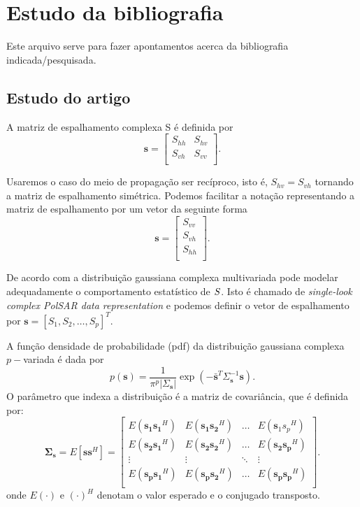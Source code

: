 \documentclass[12pt,a4paper]{article}
\begin{document}
\section{Estudo da bibliografia}

Este arquivo serve para fazer apontamentos acerca da bibliografia indicada/pesquisada.

\subsection{Estudo do artigo~\cite{lee94}}

A matriz de espalhamento complexa {\boldmath S} é definida por
$$
\mathbf{ s} = \left[
\begin{array}{cc}
	S_{hh}   & S_{hv}   \\
	S_{vh}   & S_{vv}   \\
\end{array}
\right].
$$

Usaremos o caso do meio de propagação ser recíproco, isto é, $S_{hv}=S_{vh}$ tornando a matriz de espalhamento simétrica. Podemos facilitar a notação representando a matriz de espalhamento por um vetor da seguinte forma
$$
\mathbf{s} = \left[
\begin{array}{c}
	S_{vv}      \\
	S_{vh}     \\
	S_{hh}      \\
\end{array}
\right].
$$

De acordo com \cite{goodman1963} a distribuição gaussiana complexa multivariada pode modelar adequadamente o comportamento estatístico de $\boldmath S$. Isto é chamado de {\it single-look complex PolSAR data representation} e podemos definir o vetor de espalhamento por $\mathbf{s}=[S_1,S_2,\dots,S_p]^T$. 

A função densidade de probabilidade ({\boldmath pdf}) da distribuição gaussiana complexa $p-$variada é dada por
\begin{equation}\label{eqn1}
	p(\mathbf{s})=\frac{1}{\pi^p|\Sigma_{\mathbf{s}}|}\exp(-\bar{\mathbf{s}}^{T}\Sigma_{\mathbf{s}}^{-1}\mathbf{s}).
\end{equation}
O parâmetro que indexa a distribuição é a matriz de covariância, que é definida por:
\begin{equation}\label{eqn2}
	\mathbf{ \Sigma_{s}} = E[\mathbf{ss}^H] = \left[
\begin{array}{cccc}
	E(\mathbf{s_1s_1}^H)  & E(\mathbf{s_1s_2}^H) &\hdots & E({\mathbf s_1s_p}^H) \\
	E(\mathbf{ s_2s_1}^H)  & E(\mathbf {s_2 s_2}^H) &\hdots &E(\mathbf {s_2 s_p}^H)\\
        \vdots&\vdots &\ddots &\vdots\\
	E(\mathbf{ s_ps_1}^H)  & E(\mathbf {s_ps_2}^H) &\hdots &E(\mathbf {s_ps_p}^H)\\
\end{array}
\right].
\end{equation}
onde $E(\cdot)$ e $(\cdot)^H$ denotam o valor esperado e o conjugado transposto.
\end{document}
